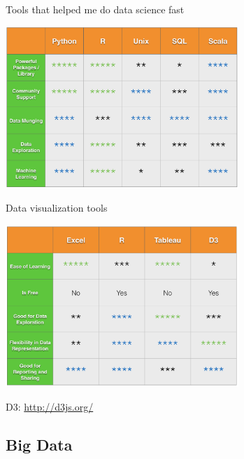 \documentclass[10pt]{beamer}
\begin{document}
    \begin{frame}{Tools that helped me do data science fast}
      \begin{center}
         \includegraphics[width=250pt]{../graphs/data_tools}
      \end{center}
    \end{frame}

    \begin{frame}{Data visualization tools}
      \begin{center}
         \includegraphics[width=250pt]{../graphs/data_visualization_tools}
      \end{center}
      \centerline{\footnotesize D3: \url{http://d3js.org/}}
    \end{frame}

  \subsection{Big Data}
\end{document}
